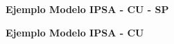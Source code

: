 	\begin{figure}[H]
		\centering
		\textbf{Ejemplo Modelo IPSA - CU - SP}\par\medskip
	\end{figure}
%	
%
%	
	\begin{figure}[H]
		\centering
		\textbf{Ejemplo Modelo IPSA - CU}\par\medskip
	\end{figure}
